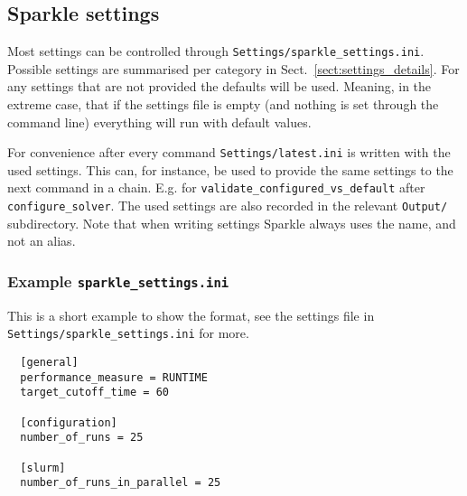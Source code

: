 \documentclass{article}
\begin{document}
\subsection{Sparkle settings}
Most settings can be controlled through \texttt{Settings/sparkle\_settings.ini}. Possible settings are summarised per category in Sect.~\ref{sect:settings_details}. For any settings that are not provided the defaults will be used. Meaning, in the extreme case, that if the settings file is empty (and nothing is set through the command line) everything will run with default values.

For convenience after every command \texttt{Settings/latest.ini} is written with the used settings. This can, for instance, be used to provide the same settings to the next command in a chain. E.g. for \texttt{validate\_configured\_vs\_default} after \texttt{configure\_solver}. The used settings are also recorded in the relevant \texttt{Output/} subdirectory. Note that when writing settings Sparkle always uses the name, and not an alias.

\subsubsection{Example \texttt{sparkle\_settings.ini}}
This is a short example to show the format, see the settings file in \texttt{Settings/sparkle\_settings.ini} for more.

\begin{verbatim}
  [general]
  performance_measure = RUNTIME
  target_cutoff_time = 60

  [configuration]
  number_of_runs = 25

  [slurm]
  number_of_runs_in_parallel = 25
\end{verbatim}
\end{document}
